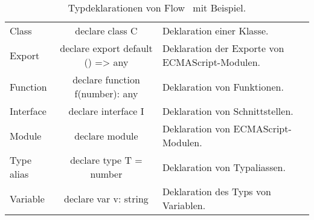\begin{longtabuenv}
\begin{longtabu} to 
    \midrule
     &  &  \\
    \midrule
  \endhead
    \midrule
    \caption{Typdeklarationen von Flow~\autocite{FLOW:LIBRARY_DEFINITIONS} mit Beispiel.}
  \endfoot
  Class       & declare class C {}               & Deklaration einer Klasse. \medskip\\
  Export      & declare export default () => any & Deklaration der Exporte von ECMAScript-Modulen. \medskip\\
  Function    & declare function f(number): any  & Deklaration von Funktionen. \medskip\\
  Interface   & declare interface I {}           & Deklaration von Schnittstellen. \medskip\\
  Module      & declare module  {} & Deklaration von ECMAScript-Modulen. \medskip\\
  Type alias  & declare type T = number          & Deklaration von Typaliassen. \medskip\\
  Variable    & declare var v: string            & Deklaration des Typs von Variablen. \medskip
  \label{tab:flow-type-declarations}
\end{longtabu}
\end{longtabuenv}
